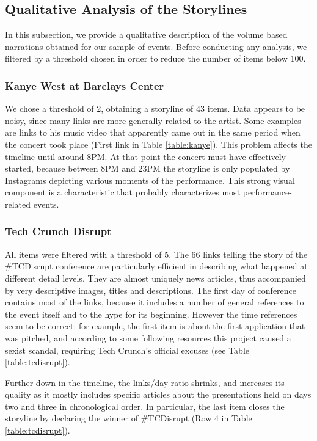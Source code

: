 \documentclass{sig-alternate}
\begin{document}
\subsection{Qualitative Analysis of the Storylines}
\label{sec:storylines}
In this subsection, we provide a qualitative description of the volume based narrations obtained for our sample of events. Before conducting any analysis, we filtered by a threshold chosen in order to reduce the number of items below 100.
\subsubsection{Kanye West at Barclays Center}
We chose a threshold of 2, obtaining a storyline of 43 items. Data appears to be noisy, since many links are more generally related to the artist. Some examples are links to his music video that apparently came out in the same period when the concert took place (First link in Table \ref{table:kanye}). This problem affects the timeline until around 8PM. At that point the concert must have effectively started, because between 8PM and 23PM the storyline is only populated by Instagrams depicting various moments of the performance. This strong visual component is a characteristic that probably characterizes most performance-related events.

\subsubsection{Tech Crunch Disrupt}
All items were filtered with a threshold of 5. The 66 links telling the story of the \#TCDisrupt conference are particularly efficient in describing what happened at different detail levels. They are almost uniquely news articles, thus accompanied by very descriptive images, titles and descriptions. The first day of conference contains most of the links, because it includes a number of general references to the event itself and to the hype for its beginning. However the time references seem to be correct: for example, the first item is about the first application that was pitched, and according to some following resources this project caused a sexist scandal, requiring Tech Crunch's official excuses (see Table \ref{table:tcdisrupt}).

Further down in the timeline, the links/day ratio shrinks, and increases its quality as it mostly includes specific articles about the presentations held on days two and three in chronological order. In particular, the last item closes the storyline by declaring the winner of \#TCDisrupt (Row 4 in Table \ref{table:tcdisrupt}).
\end{document}
